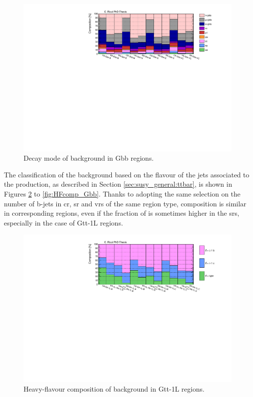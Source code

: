 \begin{figure}[htbp]
\includegraphics[width=\textwidth]{figures/strong_prod/comp_plots/Gbb_tt.pdf}
\caption{Decay mode of \ttbar background in Gbb regions.}
	\label{fig:ttcomp_Gbb}
\end{figure}


The classification of the \ttbar background based on the flavour of the jets associated to the 
\ttbar production, as described in Section \ref{sec:susy_general:ttbar}, is shown in Figures 
\ref{fig:HFcomp_Gtt1L} to \ref{fig:HFcomp_Gbb}.
Thanks to adopting the same selection on the number of b-jets in \gls{cr}, \gls{sr} and \glspl{vr} 
of the same region type, composition is similar in corresponding regions, even if the fraction of 
\tthf is sometimes higher in the \glspl{sr}, especially in the case of Gtt-1L regions. 


\begin{figure}[htbp]
\includegraphics[width=\textwidth]{figures/strong_prod/comp_plots/Gtt_1L_HF.pdf}
\caption{Heavy-flavour composition of \ttbar background in Gtt-1L regions.}
	\label{fig:HFcomp_Gtt1L}
\end{figure}

